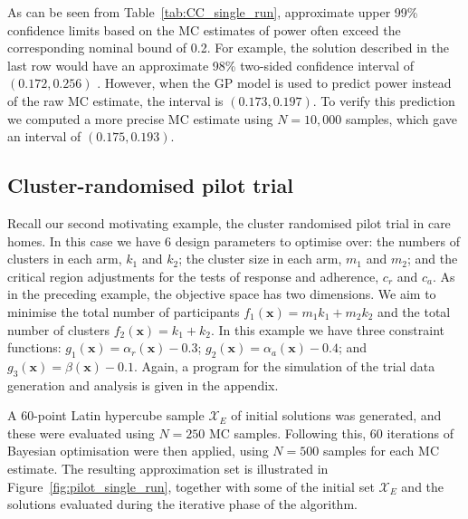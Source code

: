 \documentclass{article} %
\begin{document}

As can be seen from Table~\ref{tab:CC_single_run}, approximate upper 99\% confidence limits based on the MC estimates of power often exceed the corresponding nominal bound of 0.2. For example, the solution described in the last row would have an approximate 98\% two-sided confidence interval of $(0.172, 0.256)$ . However, when the GP model is used to predict power instead of the raw MC estimate, the interval is $(0.173, 0.197)$.  To verify this prediction we computed a more precise MC estimate using $N = 10,000$ samples, which gave an interval of $(0.175, 0.193)$.

\subsection{Cluster-randomised pilot trial}

Recall our second motivating example, the cluster randomised pilot trial in care homes. In this case we have 6 design parameters to optimise over: the numbers of clusters in each arm, $k_{1}$ and $k_{2}$; the cluster size in each arm, $m_{1}$ and $m_{2}$; and the critical region adjustments for the tests of response and adherence, $c_{r}$ and $c_{a}$. 
As in the preceding example, the objective space has two dimensions. We aim to minimise the total number of participants $f_{1}(\mathbf{x}) = m_{1}k_{1} + m_{2}k_{2}$ and the total number of clusters $f_{2}(\mathbf{x}) = k_{1} + k_{2}$. In this example we have three constraint functions: $g_{1}(\mathbf{x}) = \alpha_{r}(\mathbf{x}) - 0.3$; $g_{2}(\mathbf{x}) = \alpha_{a}(\mathbf{x}) - 0.4$; and $g_{3}(\mathbf{x}) = \beta(\mathbf{x}) - 0.1$. Again, a program for the simulation of the trial data generation and analysis is given in the appendix.

A 60-point Latin hypercube sample $\mathcal{X}_{E}$ of initial solutions was generated, and these were evaluated using $N = 250$ MC samples. Following this, 60 iterations of Bayesian optimisation were then applied, using $N = 500$ samples for each MC estimate. The resulting approximation set is illustrated in Figure~\ref{fig:pilot_single_run}, together with some of the initial set $\mathcal{X}_{E}$ and the solutions evaluated during the iterative phase of the algorithm.
\end{document}
